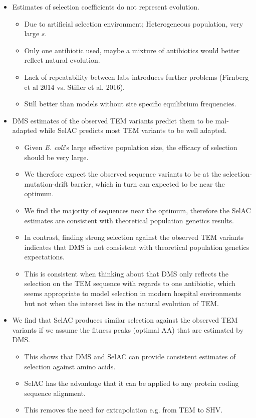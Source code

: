 \documentclass[12pt]{article}
\begin{document}
\begin{itemize}
	\item Estimates of selection coefficients do not represent evolution.
 	\begin{itemize}
		\item Due to artificial selection environment; Heterogeneous population, very large $s$. 
		\item Only one antibiotic used, maybe a mixture of antibiotics would better reflect natural evolution.
		\item Lack of repeatability between labs introduces further problems (Firnberg et al 2014 vs. Stifler et al. 2016).
		\item Still better than models without site specific equilibrium frequencies.
	\end{itemize}

	\item DMS estimates of the observed TEM variants predict them to be mal-adapted while SelAC predicts most TEM variants to be well adapted.
	\begin{itemize}
		\item Given \textit{E. coli}'s large effective population size, the efficacy of selection should be very large.
		\item We therefore expect the observed sequence variants to be at the selection-mutation-drift barrier, which in turn can expected to be near the optimum.
		\item We find the majority of sequences near the optimum, therefore the SelAC estimates are consistent with theoretical population genetics results.
		\item In contrast, finding strong selection against the observed TEM variants indicates that DMS is not consistent with theoretical population genetics expectations.
		\item This is consistent when thinking about that DMS only reflects the selection on the TEM sequence with regards to one antibiotic, which seems appropriate to model selection in modern hospital environments but not when the interest lies in the natural evolution of TEM.
	\end{itemize}

	\item We find that SelAC produces similar selection against the observed TEM variants  if we assume the fitness peaks (optimal AA) that are estimated by DMS.
	\begin{itemize}
		\item This shows that DMS and SelAC can provide consistent estimates of selection against amino acids.
		\item SelAC has the advantage that it can be applied to any protein coding sequence alignment.
		\item This removes the need for extrapolation e.g. from TEM to SHV.
	\end{itemize}


\end{itemize}
\end{document}
